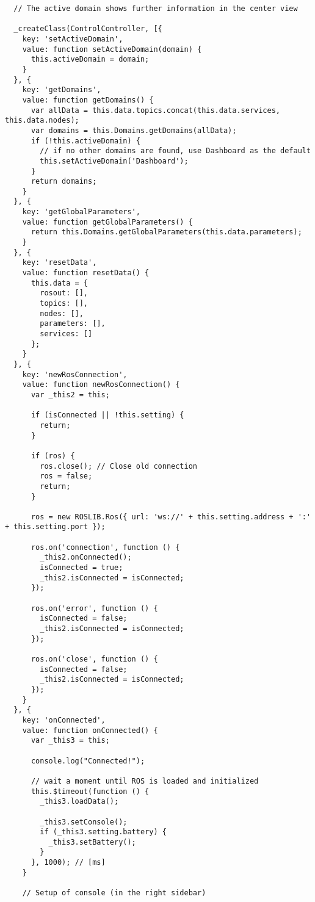 \begin{verbatim}
  // The active domain shows further information in the center view

  _createClass(ControlController, [{
    key: 'setActiveDomain',
    value: function setActiveDomain(domain) {
      this.activeDomain = domain;
    }
  }, {
    key: 'getDomains',
    value: function getDomains() {
      var allData = this.data.topics.concat(this.data.services, this.data.nodes);
      var domains = this.Domains.getDomains(allData);
      if (!this.activeDomain) {
        // if no other domains are found, use Dashboard as the default
        this.setActiveDomain('Dashboard');
      }
      return domains;
    }
  }, {
    key: 'getGlobalParameters',
    value: function getGlobalParameters() {
      return this.Domains.getGlobalParameters(this.data.parameters);
    }
  }, {
    key: 'resetData',
    value: function resetData() {
      this.data = {
        rosout: [],
        topics: [],
        nodes: [],
        parameters: [],
        services: []
      };
    }
  }, {
    key: 'newRosConnection',
    value: function newRosConnection() {
      var _this2 = this;

      if (isConnected || !this.setting) {
        return;
      }

      if (ros) {
        ros.close(); // Close old connection
        ros = false;
        return;
      }

      ros = new ROSLIB.Ros({ url: 'ws://' + this.setting.address + ':' + this.setting.port });

      ros.on('connection', function () {
        _this2.onConnected();
        isConnected = true;
        _this2.isConnected = isConnected;
      });

      ros.on('error', function () {
        isConnected = false;
        _this2.isConnected = isConnected;
      });

      ros.on('close', function () {
        isConnected = false;
        _this2.isConnected = isConnected;
      });
    }
  }, {
    key: 'onConnected',
    value: function onConnected() {
      var _this3 = this;

      console.log("Connected!");

      // wait a moment until ROS is loaded and initialized
      this.$timeout(function () {
        _this3.loadData();

        _this3.setConsole();
        if (_this3.setting.battery) {
          _this3.setBattery();
        }
      }, 1000); // [ms]
    }

    // Setup of console (in the right sidebar)


\end{verbatim}
